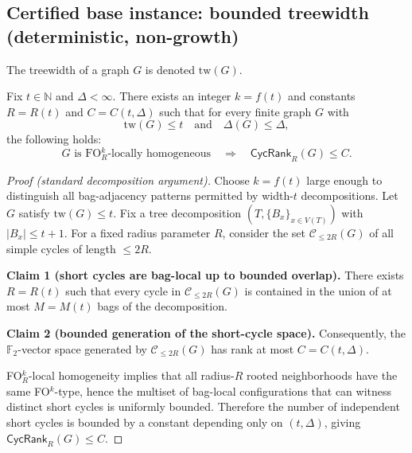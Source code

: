 
\subsection{Certified base instance: bounded treewidth (deterministic, non-growth)}

\begin{definition}[Treewidth]
The treewidth of a graph $G$ is denoted $\mathrm{tw}(G)$.
\end{definition}

\begin{theorem}\label{thm:urf-core-lg-btw}
Fix $t\in\mathbb N$ and $\Delta<\infty$.
There exists an integer $k=f(t)$ and constants $R=R(t)$ and $C=C(t,\Delta)$ such that
for every finite graph $G$ with
\[
\mathrm{tw}(G)\le t
\quad\text{and}\quad
\Delta(G)\le \Delta,
\]
the following holds:
\[
\text{$G$ is FO$^{k}_{R}$-locally homogeneous}
\quad\Longrightarrow\quad
\mathsf{CycRank}_{R}(G)\le C.
\]
\end{theorem}

\begin{proof}[Proof (standard decomposition argument)]
Choose $k=f(t)$ large enough to distinguish all bag-adjacency patterns permitted by width-$t$ decompositions.
Let $G$ satisfy $\mathrm{tw}(G)\le t$.
Fix a tree decomposition $(T,\{B_x\}_{x\in V(T)})$ with $|B_x|\le t+1$.
For a fixed radius parameter $R$, consider the set $\mathcal C_{\le 2R}(G)$ of all simple cycles of length $\le 2R$.

\medskip
\noindent\textbf{Claim 1 (short cycles are bag-local up to bounded overlap).}
There exists $R=R(t)$ such that every cycle in $\mathcal C_{\le 2R}(G)$ is contained in the union of at most
$M=M(t)$ bags of the decomposition.

\medskip
\noindent\textbf{Claim 2 (bounded generation of the short-cycle space).}
Consequently, the $\mathbb F_2$-vector space generated by $\mathcal C_{\le 2R}(G)$ has rank at most
$C=C(t,\Delta)$.

\medskip
FO$^k_R$-local homogeneity implies that all radius-$R$ rooted neighborhoods have the same FO$^k$-type, hence
the multiset of bag-local configurations that can witness distinct short cycles is uniformly bounded.
Therefore the number of independent short cycles is bounded by a constant depending only on $(t,\Delta)$, giving
$\mathsf{CycRank}_R(G)\le C$.
\end{proof}

